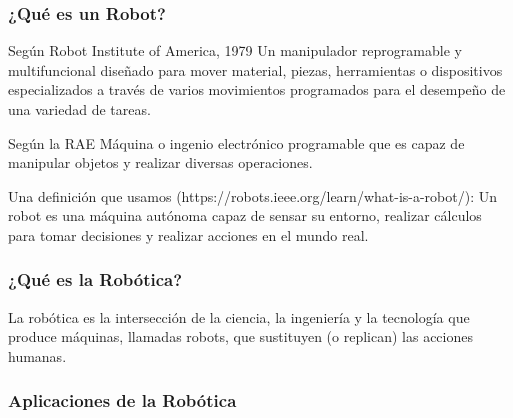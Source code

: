 \begin{frame}
    \frametitle{¿Qué es un Robot?}
    
    Según Robot Institute of America, 1979
    Un manipulador reprogramable y multifuncional diseñado para mover material, piezas, herramientas o dispositivos especializados a través de varios movimientos programados para el desempeño de una variedad de tareas.
    
    Según la RAE
    Máquina o ingenio electrónico programable que es capaz de manipular objetos y realizar diversas operaciones.
    
    Una definición que usamos (https://robots.ieee.org/learn/what-is-a-robot/):
    Un robot es una máquina autónoma capaz de sensar su entorno, realizar cálculos para tomar decisiones y realizar acciones en el mundo real.
    
    \note{}
\end{frame}

\begin{frame}
    \frametitle{¿Qué es la Robótica?}
    La robótica es la intersección de la ciencia, la ingeniería y la tecnología que produce máquinas, llamadas robots, que sustituyen (o replican) las acciones humanas.
\end{frame}

\begin{frame}
    \frametitle{Aplicaciones de la Robótica}
\end{frame}

